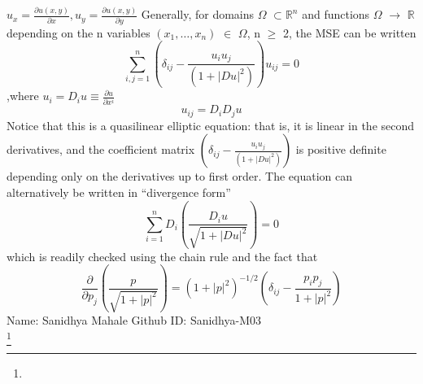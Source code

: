 \documentclass[11pt,a4paper]{article}
\begin{document}
${u_x} = \frac{{\partial u\left( {x,y} \right)}}{{\partial x}},{u_y} = \frac{{\partial u\left( {x,y} \right)}}{{\partial y}}$ Generally, for domains $\Omega$ $\subset \mathbb{R}^n$ and functions $\Omega$ $\rightarrow$ $\mathbb{R}$ depending on the n variables $(x_1, …, x_n)$ $\in$  $\Omega$, n $\geq$ 2, the MSE can be written 
\\
\begin{equation}
\sum\limits_{i,j = 1}^n {\left( {{\delta _{ij}} - \frac{{{u_i}{u_j}}}{{\left( {1 + |Du{|^2}} \right)}}} \right){u_{ij}} = 0}
\end{equation}
,where ${u_i} = {D_i}u \equiv \frac{{\partial u}}{{\partial {x^i}}}$
\begin{equation*}
 u_{ij} = D_i D_j u   
\end{equation*} Notice that this is a quasilinear elliptic equation: that is, it is linear in the second derivatives, and the coefficient matrix $\left( {{\delta _{ij}} - \frac{{{u_i}{u_j}}}{{\left( {1 + |Du{|^2}} \right)}}} \right)$ is positive definite depending only on the derivatives up to first order. The equation can alternatively be written in “divergence form”
\begin{equation}
    \sum\limits_{i = 1}^n {{D_i}} \left( {\frac{{{D_i}u}}{{\sqrt {1 + |Du{|^2}} }}} \right) = 0
\end{equation}
which is readily checked using the chain rule and the fact that
\begin{equation}
    \frac{\partial }{{\partial {p_j}}}\left( {\frac{p}{{\sqrt {1 + |p{|^2}} }}} \right) = {\left( {1 + |p{|^2}} \right)^{ - 1/2}}\left( {{\delta _{ij}} - \frac{{{p_i}{p_j}}}{{1 + |p{|^2}}}} \right)
\end{equation}
Name: Sanidhya Mahale Github ID: Sanidhya-M03
\\
\footnote{
}
\end{document}
